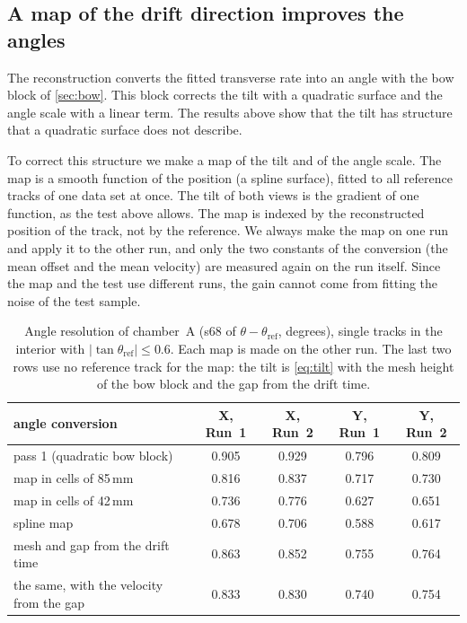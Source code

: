 \subsection{A map of the drift direction improves the angles}
The reconstruction converts the fitted transverse rate into an angle with the bow block of \cref{sec:bow}. This block
corrects the tilt with a quadratic surface and the angle scale with a linear term. The results above show that the
tilt has structure that a quadratic surface does not describe.

To correct this structure we make a map of the tilt and of the angle scale. The map is a smooth function of the
position (a spline surface), fitted to all reference tracks of one data set at once. The tilt of both views is the
gradient of one function, as the test above allows. The map is indexed by the reconstructed position of the track,
not by the reference. We always make the map on one run and apply it to the other run, and only the two constants of
the conversion (the mean offset and the mean velocity) are measured again on the run itself. Since the map and the
test use different runs, the gain cannot come from fitting the noise of the test sample.

\begin{table}[tbp]
  \centering
  \caption{Angle resolution of chamber~A (s68 of $\theta-\theta_\mathrm{ref}$, degrees), single tracks in the
  interior with $|\tan\theta_\mathrm{ref}|\le0.6$. Each map is made on the other run. The last two rows use no
  reference track for the map: the tilt is \cref{eq:tilt} with the mesh height of the bow block and the gap from the
  drift time.}
  \label{tab:anglemap}
  \begin{tabular}{lcccc}
    \hline
    angle conversion & X, Run~1 & X, Run~2 & Y, Run~1 & Y, Run~2 \\
    \hline
    pass 1 (quadratic bow block)            & 0.905 & 0.929 & 0.796 & 0.809 \\
    map in cells of 85\,mm                  & 0.816 & 0.837 & 0.717 & 0.730 \\
    map in cells of 42\,mm                  & 0.736 & 0.776 & 0.627 & 0.651 \\
    spline map                              & 0.678 & 0.706 & 0.588 & 0.617 \\
    \hline
    mesh and gap from the drift time        & 0.863 & 0.852 & 0.755 & 0.764 \\
    the same, with the velocity from the gap & 0.833 & 0.830 & 0.740 & 0.754 \\
    \hline
  \end{tabular}
\end{table}

